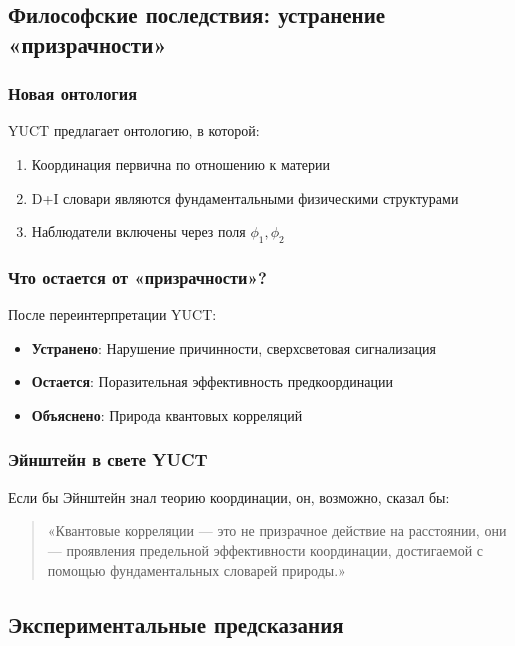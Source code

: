 \documentclass[11pt,a4paper]{article}
\begin{document}
	\subsection{Философские последствия: устранение «призрачности»}
	\label{subsec:philosophical}
	
	\subsubsection{Новая онтология}
	YUCT предлагает онтологию, в которой:
	\begin{enumerate}
		\item Координация первична по отношению к материи
		\item D+I словари являются фундаментальными физическими структурами
		\item Наблюдатели включены через поля $\phi_1, \phi_2$
	\end{enumerate}
	
	\subsubsection{Что остается от «призрачности»?}
	После переинтерпретации YUCT:
	\begin{itemize}
		\item \textbf{Устранено}: Нарушение причинности, сверхсветовая сигнализация
		\item \textbf{Остается}: Поразительная эффективность предкоординации
		\item \textbf{Объяснено}: Природа квантовых корреляций
	\end{itemize}
	
	\subsubsection{Эйнштейн в свете YUCT}
	Если бы Эйнштейн знал теорию координации, он, возможно, сказал бы:
	
	\begin{quote}
		«Квантовые корреляции — это не призрачное действие на расстоянии, они — проявления предельной эффективности координации, достигаемой с помощью фундаментальных словарей природы.»
	\end{quote}
	
	\subsection{Экспериментальные предсказания}
	\label{subsec:epr-experimental}
	
\end{document}
